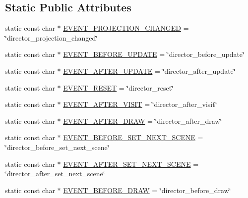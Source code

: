 \subsection*{Static Public Attributes}
\begin{DoxyCompactItemize}
\item 
static const char $\ast$ \hyperlink{classDirector_a30d53951c86968fed8dddd9672faef64}{E\+V\+E\+N\+T\+\_\+\+P\+R\+O\+J\+E\+C\+T\+I\+O\+N\+\_\+\+C\+H\+A\+N\+G\+ED} = \char`\"{}director\+\_\+projection\+\_\+changed\char`\"{}
\item 
static const char $\ast$ \hyperlink{classDirector_a345124acb6519068c291f4ffbf4e1068}{E\+V\+E\+N\+T\+\_\+\+B\+E\+F\+O\+R\+E\+\_\+\+U\+P\+D\+A\+TE} = \char`\"{}director\+\_\+before\+\_\+update\char`\"{}
\item 
static const char $\ast$ \hyperlink{classDirector_a9b3d1b74e6fb8098d832d7896a87babd}{E\+V\+E\+N\+T\+\_\+\+A\+F\+T\+E\+R\+\_\+\+U\+P\+D\+A\+TE} = \char`\"{}director\+\_\+after\+\_\+update\char`\"{}
\item 
static const char $\ast$ \hyperlink{classDirector_a4689f4e4daf5179fc590f0af2f9ac554}{E\+V\+E\+N\+T\+\_\+\+R\+E\+S\+ET} = \char`\"{}director\+\_\+reset\char`\"{}
\item 
static const char $\ast$ \hyperlink{classDirector_a666b12067c13df6d2ad1a2a687223344}{E\+V\+E\+N\+T\+\_\+\+A\+F\+T\+E\+R\+\_\+\+V\+I\+S\+IT} = \char`\"{}director\+\_\+after\+\_\+visit\char`\"{}
\item 
static const char $\ast$ \hyperlink{classDirector_ad8fe3c8b557d53d56dd4633469adadca}{E\+V\+E\+N\+T\+\_\+\+A\+F\+T\+E\+R\+\_\+\+D\+R\+AW} = \char`\"{}director\+\_\+after\+\_\+draw\char`\"{}
\item 
static const char $\ast$ \hyperlink{classDirector_a69288fc7e21b4609c37b8625518bf10a}{E\+V\+E\+N\+T\+\_\+\+B\+E\+F\+O\+R\+E\+\_\+\+S\+E\+T\+\_\+\+N\+E\+X\+T\+\_\+\+S\+C\+E\+NE} = \char`\"{}director\+\_\+before\+\_\+set\+\_\+next\+\_\+scene\char`\"{}
\item 
static const char $\ast$ \hyperlink{classDirector_a6007f71559e15f852461dbf8cb1ffac3}{E\+V\+E\+N\+T\+\_\+\+A\+F\+T\+E\+R\+\_\+\+S\+E\+T\+\_\+\+N\+E\+X\+T\+\_\+\+S\+C\+E\+NE} = \char`\"{}director\+\_\+after\+\_\+set\+\_\+next\+\_\+scene\char`\"{}
\item 
static const char $\ast$ \hyperlink{classDirector_a7e0dab9d5caa7903d7f1d5761c2986a0}{E\+V\+E\+N\+T\+\_\+\+B\+E\+F\+O\+R\+E\+\_\+\+D\+R\+AW} = \char`\"{}director\+\_\+before\+\_\+draw\char`\"{}
\end{DoxyCompactItemize}
